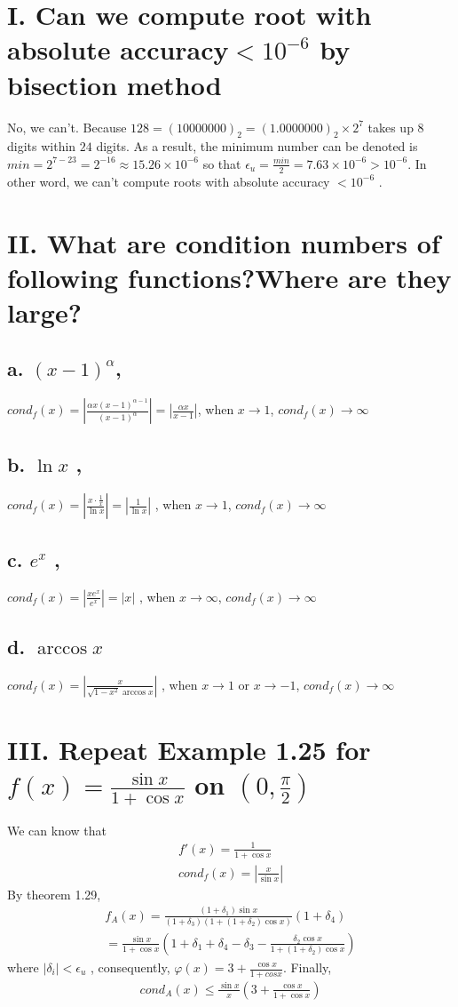 \documentclass[twoside,a4paper]{article}
\begin{document}
\pagestyle{fancy}
\fancyhead{}


\section*{I. Can we compute root with absolute accuracy$<10^{-6}$ by bisection method}
No, we can't. Because $128=(10000000)_2=(1.0000000)_2\times2^{7}$ takes up $8$ digits within $24$ digits. As a result, the minimum number can be denoted is $min=2^{7-23}=2^{-16}\approx15.26\times10^{-6}$ so that $\epsilon_u = \frac{min}{2}=7.63\times10^{-6}>10^{-6}$. In other word, we can't compute roots with absolute accuracy $<10^{-6}$ .

\section*{II. What are condition numbers of following functions?Where are they large?}
\subsection*{a. $(x-1)^\alpha$,}
$cond_f(x)=|\frac{\alpha x(x-1)^{\alpha-1}}{(x-1)^\alpha}|=|\frac{\alpha x}{x-1}|$, when $x\to1$, $cond_f(x)\to\infty$
\subsection*{b. $\ln{x}$ ,}
$cond_f(x)=|\frac{x\cdot\frac{1}{x}}{\ln{x}}|=|\frac{1}{\ln{x}}|$ , when $x\to1$, $cond_f(x)\to\infty$
\subsection*{c. $e^{x}$ ,}
$cond_f(x)=|\frac{xe^x}{e^x}|=|x|$ , when $x\to\infty$, $cond_f(x)\to\infty$
\subsection*{d. $\arccos{x}$}
$cond_f(x)=|\frac{x}{\sqrt{1-x^2}\arccos{x}}|$ , when $x\to 1$ or $x\to-1$, $cond_f(x)\to\infty$ 
\section*{III. Repeat Example 1.25 for $f(x)=\frac{\sin{x}}{1+\cos{x}}$ on $(0,\frac{\pi}{2})$}
We can know that
\begin{gather}
f'(x)=\frac{1}{1+\cos{x}}\\
cond_f(x)=|\frac{x}{\sin{x}}|
\end{gather}
By theorem 1.29, 
\begin{gather}
f_A(x)=\frac{(1+\delta_1)\sin{x}}{(1+\delta_3)(1+(1+\delta_2)\cos{x})}(1+\delta_4)\\
=\frac{\sin{x}}{1+\cos{x}}(1+\delta_1+\delta_4-\delta_3-\frac{\delta_2\cos{x}}{1+(1+\delta_2)\cos{x}})
\end{gather}
where $|\delta_i|<\epsilon_u$ , consequently, $\varphi(x)=3+\frac{\cos{x}}{1+cos{x}}$. Finally,
\begin{gather}
cond_A(x)\leq\frac{\sin{x}}{x}(3+\frac{\cos{x}}{1+\cos{x}})
\end{gather}
\end{document}

